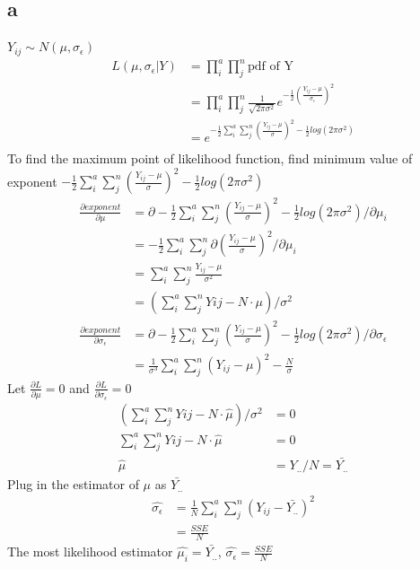 \documentclass[11pt,letterpaper]{article}
\begin{document}
\subsection*{a}
\noindent $Y_{ij} \sim N(\mu, \sigma_{\epsilon})$
\begin{align*}
L(\mu, \sigma_{\epsilon} | Y) &= \prod_i^a \prod_j^n \text{pdf of Y} \\
&= \prod_i^a \prod_j^n \frac{1}{\sqrt{2 \pi \sigma^2}} e^{-\frac{1}{2} (\frac{Y_{ij} - \mu}{\sigma_{\epsilon}})^2} \\
&= e^{-\frac{1}{2} \sum_i^a \sum_j^n (\frac{Y_{ij} - \mu}{\sigma})^2 - \frac{1}{2} log(2 \pi \sigma^2)} \\
\end{align*}
\noindent To find the maximum point of likelihood function, find minimum value of exponent $-\frac{1}{2} \sum_i^a \sum_j^n (\frac{Y_{ij} - \mu}{\sigma})^2 - \frac{1}{2} log(2 \pi \sigma^2)$  
\begin{align*}
\frac{\partial exponent}{\partial \mu} &= \partial -\frac{1}{2} \sum_i^a \sum_j^n (\frac{Y_{ij} - \mu}{\sigma})^2 - \frac{1}{2} log(2 \pi \sigma^2) / \partial \mu_i \\
&= -\frac{1}{2} \sum_i^a \sum_j^n \partial (\frac{Y_{ij} - \mu}{\sigma})^2 / \partial \mu_i \\
&= \sum_i^a \sum_j^n \frac{Y_{ij} - \mu}{\sigma^2} \\
&= (\sum_i^a \sum_j^n Yij - N \cdot \mu ) / \sigma^2
\end{align*}
\begin{align*}
\frac{\partial exponent}{\partial \sigma_{\epsilon}} &= \partial -\frac{1}{2} \sum_i^a \sum_j^n (\frac{Y_{ij} - \mu}{\sigma})^2 - \frac{1}{2} log(2 \pi \sigma^2) / \partial \sigma_{\epsilon} \\
&= \frac{1}{\sigma^3} \sum_i^a \sum_j^n (Y_{ij} - \mu)^2 - \frac{N}{\sigma}
\end{align*}
\noindent Let $\frac{\partial L}{\partial \mu} = 0$ and $\frac{\partial L}{\partial \sigma_{\epsilon}}  = 0$
\begin{align*}
(\sum_i^a \sum_j^n Yij - N \cdot \hat{\mu} ) / \sigma^2 &= 0 \\
\sum_i^a \sum_j^n Yij - N \cdot \hat{\mu} &= 0 \\
\hat{\mu} &= Y_{..} / N = \bar{Y_{..}}
\end{align*}
\noindent Plug in the estimator of $ \mu$ as $\bar{Y_{..}}$
\begin{align*}
\hat{\sigma_{\epsilon}} &=  \frac{1}{N} \sum_i^a \sum_j^n (Y_{ij} - \bar{Y_{..}} )^2 \\
&= \frac{SSE}{N} 
\end{align*}
\noindent The most likelihood estimator $\hat{\mu_i} = \bar{Y_{..}}$, $\hat{\sigma_{\epsilon}} = \frac{SSE}{N}$ \\
\end{document}
